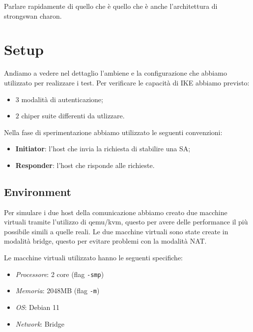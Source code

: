 \documentclass[
10pt, %
a4paper, %
oneside, %
headinclude,footinclude, %
BCOR5mm, %
]{scrartcl}
\begin{document}
Parlare rapidamente di quello che è
quello che è anche l'architettura di strongswan charon.


\newpage

\section{Setup}

Andiamo a vedere nel dettaglio l'ambiene e la configurazione che abbiamo utilizzato per realizzare i test. Per verificare le capacità di IKE abbiamo previsto:
\begin{itemize}
    \item $3$ modalità di autenticazione;
    \item $2$ chiper suite differenti da utlizzare.
\end{itemize}

\noindent
Nella fase di sperimentazione abbiamo utilizzato le seguenti convenzioni:
\begin{itemize}
    \item \textbf{Initiator}: l'host che invia la richiesta di stabilire una SA;
    \item \textbf{Responder}: l'host che risponde alle richieste.
\end{itemize}


\subsection{Environment}

Per simulare i due host della comunicazione abbiamo creato due macchine virtuali tramite l'utilizzo di qemu/kvm, questo per avere 
delle performance il più possibile simili a quelle reali. Le due macchine virtuali sono state create in modalità bridge, questo per evitare problemi con la modalità NAT.

\noindent
Le macchine virtuali utilizzato hanno le seguenti specifiche:

\begin{itemize}
    \item \textit{Processore}: 2 core (flag \lstinline|-smp|)
    \item \textit{Memoria}: 2048MB (flag \lstinline|-m|)
    \item \textit{OS}: Debian 11
    \item \textit{Network}: Bridge
\end{itemize}
\end{document}
